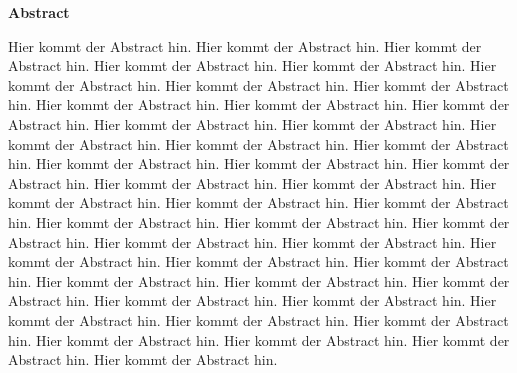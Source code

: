 %
%
\vspace*{2cm}

\begin{center}
    \textbf{Abstract}
\end{center}

\vspace*{1cm}

\noindent Hier kommt der Abstract hin. Hier kommt der Abstract hin. Hier kommt der Abstract hin. Hier kommt der Abstract hin. Hier kommt der Abstract hin. Hier kommt der Abstract hin. Hier kommt der Abstract hin. Hier kommt der Abstract hin. Hier kommt der Abstract hin. Hier kommt der Abstract hin. Hier kommt der Abstract hin. Hier kommt der Abstract hin. Hier kommt der Abstract hin. Hier kommt der Abstract hin. Hier kommt der Abstract hin. Hier kommt der Abstract hin. Hier kommt der Abstract hin. Hier kommt der Abstract hin. Hier kommt der Abstract hin. Hier kommt der Abstract hin. Hier kommt der Abstract hin. Hier kommt der Abstract hin. Hier kommt der Abstract hin. Hier kommt der Abstract hin. Hier kommt der Abstract hin. Hier kommt der Abstract hin. Hier kommt der Abstract hin. Hier kommt der Abstract hin. Hier kommt der Abstract hin. Hier kommt der Abstract hin. Hier kommt der Abstract hin. Hier kommt der Abstract hin. Hier kommt der Abstract hin. Hier kommt der Abstract hin. Hier kommt der Abstract hin. Hier kommt der Abstract hin. Hier kommt der Abstract hin. Hier kommt der Abstract hin. Hier kommt der Abstract hin. Hier kommt der Abstract hin. Hier kommt der Abstract hin. Hier kommt der Abstract hin. Hier kommt der Abstract hin. Hier kommt der Abstract hin. 

